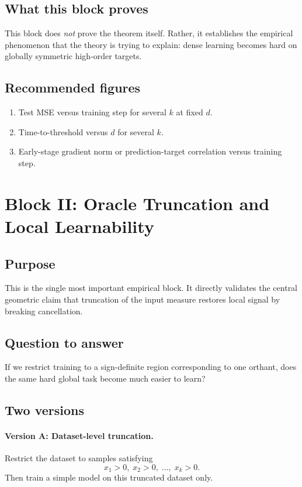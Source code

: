 \documentclass[11pt]{article}
\begin{document}
\subsection{What this block proves}

This block does \emph{not} prove the theorem itself. Rather, it establishes the empirical phenomenon that the theory is trying to explain: dense learning becomes hard on globally symmetric high-order targets.

\subsection{Recommended figures}

\begin{enumerate}[leftmargin=2em]
    \item Test MSE versus training step for several $k$ at fixed $d$.
    \item Time-to-threshold versus $d$ for several $k$.
    \item Early-stage gradient norm or prediction-target correlation versus training step.
\end{enumerate}

\section{Block II: Oracle Truncation and Local Learnability}

\subsection{Purpose}

This is the single most important empirical block. It directly validates the central geometric claim that truncation of the input measure restores local signal by breaking cancellation.

\subsection{Question to answer}

If we restrict training to a sign-definite region corresponding to one orthant, does the same hard global task become much easier to learn?

\subsection{Two versions}

\paragraph{Version A: Dataset-level truncation.}
Restrict the dataset to samples satisfying
\begin{equation}
    x_1 > 0,\; x_2 > 0,\; \dots,\; x_k > 0.
\end{equation}
Then train a simple model on this truncated dataset only.
\end{document}

